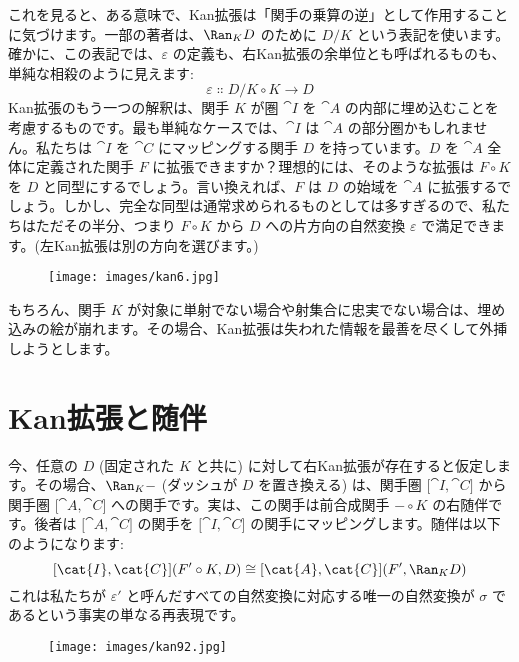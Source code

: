 \noindent
これを見ると、ある意味で、Kan拡張は「関手の乗算の逆」として作用することに気づけます。一部の著者は、$\Ran_{K}D$ のために $D/K$ という表記を使います。確かに、この表記では、$\varepsilon$ の定義も、右Kan拡張の余単位とも呼ばれるものも、単純な相殺のように見えます:
\[\varepsilon \Colon D/K \circ K \to D\]
Kan拡張のもう一つの解釈は、関手 $K$ が圏 $\cat{I}$ を $\cat{A}$ の内部に埋め込むことを考慮するものです。最も単純なケースでは、$\cat{I}$ は $\cat{A}$ の部分圏かもしれません。私たちは $\cat{I}$ を $\cat{C}$ にマッピングする関手 $D$ を持っています。$D$ を $\cat{A}$ 全体に定義された関手 $F$ に拡張できますか？理想的には、そのような拡張は $F \circ K$ を $D$ と同型にするでしょう。言い換えれば、$F$ は $D$ の始域を $\cat{A}$ に拡張するでしょう。しかし、完全な同型は通常求められるものとしては多すぎるので、私たちはただその半分、つまり $F \circ K$ から $D$ への片方向の自然変換 $\varepsilon$ で満足できます。(左Kan拡張は別の方向を選びます。) 

\begin{figure}[H]
  \centering
  \texttt{[image: images/kan6.jpg]}
\end{figure}

\noindent
もちろん、関手 $K$ が対象に単射でない場合や射集合に忠実でない場合は、埋め込みの絵が崩れます。その場合、Kan拡張は失われた情報を最善を尽くして外挿しようとします。

\section{Kan拡張と随伴}

今、任意の $D$  (固定された $K$ と共に) に対して右Kan拡張が存在すると仮定します。その場合、$\Ran_{K}-$ (ダッシュが $D$ を置き換える) は、関手圏 ${[}\cat{I}, \cat{C}{]}$ から関手圏 ${[}\cat{A}, \cat{C}{]}$ への関手です。実は、この関手は前合成関手 $- \circ K$ の右随伴です。後者は ${[}\cat{A}, \cat{C}{]}$ の関手を ${[}\cat{I}, \cat{C}{]}$ の関手にマッピングします。随伴は以下のようになります:
\[[\cat{I}, \cat{C}](F' \circ K, D) \cong [\cat{A}, \cat{C}](F', \Ran_{K}D)\]
これは私たちが $\varepsilon'$ と呼んだすべての自然変換に対応する唯一の自然変換が $\sigma$ であるという事実の単なる再表現です。

\begin{figure}[H]
  \centering
  \texttt{[image: images/kan92.jpg]}
\end{figure}

